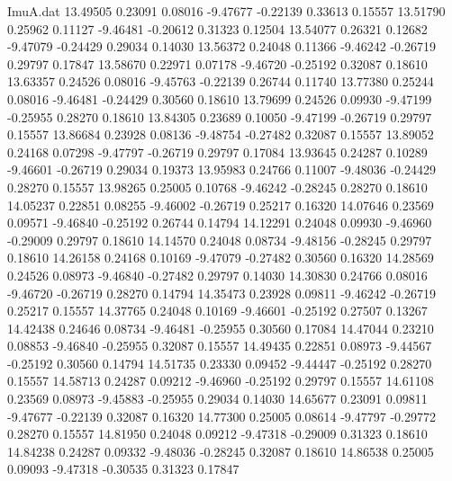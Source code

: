 \begin{filecontents}{ImuA.dat}
  13.49505    0.23091    0.08016   -9.47677   -0.22139    0.33613    0.15557
  13.51790    0.25962    0.11127   -9.46481   -0.20612    0.31323    0.12504
  13.54077    0.26321    0.12682   -9.47079   -0.24429    0.29034    0.14030
  13.56372    0.24048    0.11366   -9.46242   -0.26719    0.29797    0.17847
  13.58670    0.22971    0.07178   -9.46720   -0.25192    0.32087    0.18610
  13.63357    0.24526    0.08016   -9.45763   -0.22139    0.26744    0.11740
  13.77380    0.25244    0.08016   -9.46481   -0.24429    0.30560    0.18610
  13.79699    0.24526    0.09930   -9.47199   -0.25955    0.28270    0.18610
  13.84305    0.23689    0.10050   -9.47199   -0.26719    0.29797    0.15557
  13.86684    0.23928    0.08136   -9.48754   -0.27482    0.32087    0.15557
  13.89052    0.24168    0.07298   -9.47797   -0.26719    0.29797    0.17084
  13.93645    0.24287    0.10289   -9.46601   -0.26719    0.29034    0.19373
  13.95983    0.24766    0.11007   -9.48036   -0.24429    0.28270    0.15557
  13.98265    0.25005    0.10768   -9.46242   -0.28245    0.28270    0.18610
  14.05237    0.22851    0.08255   -9.46002   -0.26719    0.25217    0.16320
  14.07646    0.23569    0.09571   -9.46840   -0.25192    0.26744    0.14794
  14.12291    0.24048    0.09930   -9.46960   -0.29009    0.29797    0.18610
  14.14570    0.24048    0.08734   -9.48156   -0.28245    0.29797    0.18610
  14.26158    0.24168    0.10169   -9.47079   -0.27482    0.30560    0.16320
  14.28569    0.24526    0.08973   -9.46840   -0.27482    0.29797    0.14030
  14.30830    0.24766    0.08016   -9.46720   -0.26719    0.28270    0.14794
  14.35473    0.23928    0.09811   -9.46242   -0.26719    0.25217    0.15557
  14.37765    0.24048    0.10169   -9.46601   -0.25192    0.27507    0.13267
  14.42438    0.24646    0.08734   -9.46481   -0.25955    0.30560    0.17084
  14.47044    0.23210    0.08853   -9.46840   -0.25955    0.32087    0.15557
  14.49435    0.22851    0.08973   -9.44567   -0.25192    0.30560    0.14794
  14.51735    0.23330    0.09452   -9.44447   -0.25192    0.28270    0.15557
  14.58713    0.24287    0.09212   -9.46960   -0.25192    0.29797    0.15557
  14.61108    0.23569    0.08973   -9.45883   -0.25955    0.29034    0.14030
  14.65677    0.23091    0.09811   -9.47677   -0.22139    0.32087    0.16320
  14.77300    0.25005    0.08614   -9.47797   -0.29772    0.28270    0.15557
  14.81950    0.24048    0.09212   -9.47318   -0.29009    0.31323    0.18610
  14.84238    0.24287    0.09332   -9.48036   -0.28245    0.32087    0.18610
  14.86538    0.25005    0.09093   -9.47318   -0.30535    0.31323    0.17847

\end{filecontents}
